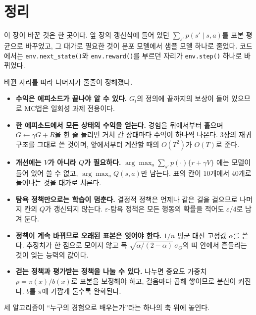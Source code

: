 \documentclass[11pt,a4paper]{article}
\begin{document}
\section{정리}
\label{sec:summary}

이 장이 바꾼 것은 한 곳이다. 앞 장의 갱신식에 들어 있던 $\sum_{s'} p(s'\mid s,a)$를 표본 평균으로
바꾸었고, 그 대가로 필요한 것이 분포 모델에서 샘플 모델 하나로 줄었다. 코드에서는
\lstinline|env.next_state()|와 \lstinline|env.reward()|를 부르던 자리가 \lstinline|env.step()|
하나로 바뀌었다.

바뀐 자리를 따라 나머지가 줄줄이 정해졌다.

\begin{itemize}[leftmargin=*,itemsep=3pt]
  \item \textbf{수익은 에피소드가 끝나야 알 수 있다.} $G_t$의 정의에 끝까지의 보상이 들어 있으므로
        MC법은 일회성 과제 전용이다.
  \item \textbf{한 에피소드에서 모든 상태의 수익을 얻는다.} 경험을 뒤에서부터 훑으며
        $G \leftarrow \gamma G + R$을 한 줄 돌리면 거쳐 간 상태마다 수익이 하나씩 나온다. 3장의
        재귀 구조를 그대로 쓴 것이며, 앞에서부터 계산할 때의 $O(T^2)$가 $O(T)$로 준다.
  \item \textbf{개선에는 $V$가 아니라 $Q$가 필요하다.} $\arg\max_a \sum_{s'} p(\cdot)\{r + \gamma V\}$
        에는 모델이 들어 있어 쓸 수 없고, $\arg\max_a Q(s,a)$만 남는다. 표의 칸이 $10$개에서
        $40$개로 늘어나는 것을 대가로 치른다.
  \item \textbf{탐욕 정책만으로는 학습이 멈춘다.} 결정적 정책은 언제나 같은 길을 걸으므로 나머지
        칸의 $Q$가 갱신되지 않는다. $\varepsilon$-탐욕 정책은 모든 행동의 확률을
        적어도 $\varepsilon/4$로 남겨 둔다.
  \item \textbf{정책이 계속 바뀌므로 오래된 표본은 잊어야 한다.} $1/n$ 평균 대신 고정값 $\alpha$를
        쓴다. 추정치가 한 점으로 모이지 않고 폭 $\sqrt{\alpha/(2-\alpha)}\,\sigma_G$의 띠 안에서
        흔들리는 것이 잊는 능력의 값이다.
  \item \textbf{걷는 정책과 평가받는 정책을 나눌 수 있다.} 나누면 중요도 가중치
        $\rho = \pi(x)/b(x)$로 표본을 보정해야 하고, 걸음마다 곱해 쌓이므로 분산이 커진다. $b$를
        $\pi$에 가깝게 둘수록 완화된다.
\end{itemize}

세 알고리즘이 ``누구의 경험으로 배우는가''라는 하나의 축 위에 놓인다.
\end{document}
